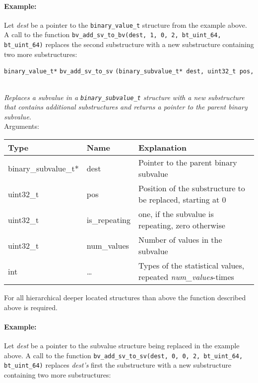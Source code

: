\documentclass[documentation]{subfiles}
\begin{document}
\paragraph{Example:}
Let {\em dest} be a pointer to the {\tt binary\_value\_t} structure from the example above. A call to the function {\tt bv\_add\_sv\_to\_bv(dest, 1, 0, 2, bt\_uint\_64, bt\_uint\_64)} replaces the second substructure with a new substructure containing two more substructures:
\begin{figure}[H]
    \centering
\end{figure}
\vspace{18pt}
\begin{tabbing}
\={\tt binary\_value\_t*} \={\tt bv\_add\_sv\_to\_sv} \={\tt(binary\_subvalue\_t* dest, uint32\_t pos,} \\
\>\> \\
\end{tabbing}
{\em Replaces a subvalue in a {\tt binary\_subvalue\_t} structure with a new substructure that contains additional substructures and returns a pointer to the parent binary subvalue.}\\[2ex]
Arguments:
\begin{longtable}{lll}
    \toprule
    {\bf Type} & {\bf Name} & {\bf Explanation} \\
    \midrule\endhead%
    binary\_subvalue\_t* & dest & Pointer to the parent binary subvalue \\
    uint32\_t & pos & Position of the substructure to be replaced, starting at 0 \\
    uint32\_t & is\_repeating & one, if the subvalue is repeating, zero otherwise \\
    uint32\_t & num\_values & Number of values in the subvalue \\
    int & \ldots & Types of the statistical values, repeated \textit{num\_values}-times \\
    \bottomrule
\end{longtable}
For all hierarchical deeper located structures than above the function described above is required.

\paragraph{Example:}
Let {\em dest} be a pointer to the subvalue structure being replaced in the example above. A call to the function {\tt bv\_add\_sv\_to\_sv(dest, 0, 0, 2, bt\_uint\_64, bt\_uint\_64)} replaces {\em dest's} first the substructure with a new substructure containing two more substructures:
\begin{figure}[H]
    \centering
\end{figure}
\end{document}
